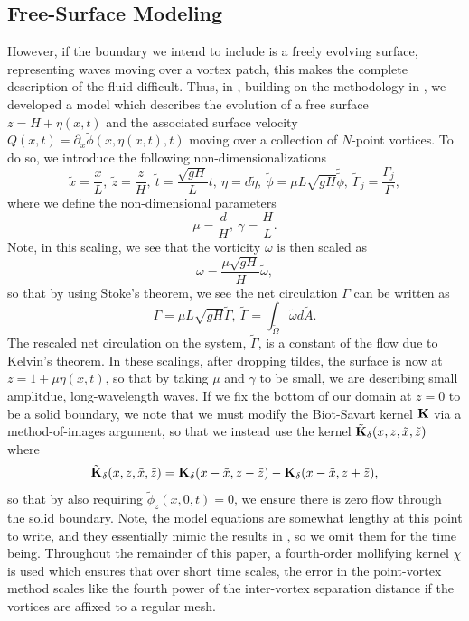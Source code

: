 \documentclass[a4paper,11pt]{article}
\newcommand{\p}{\partial}
\begin{document}
\subsection*{Free-Surface Modeling}
However, if the boundary we intend to include is a freely evolving surface, representing waves moving over a vortex patch, this makes the complete description of the fluid difficult.  Thus, in \cite{curtis}, building on the methodology in \cite{afm}, we developed a model which describes the evolution of a free surface $z=H + \eta(x,t)$ and the associated surface velocity $Q(x,t) = \p_{x} \tilde{\phi}(x,\eta(x,t),t)$ moving over a collection of $N$-point vortices.  To do so, we introduce the following non-dimensionalizations
\[
\tilde{x} = \frac{x}{L}, ~\tilde{z} = \frac{z}{H}, ~ \tilde{t} = \frac{\sqrt{gH}}{L} t, ~ \eta = d\tilde{\eta}, ~ \tilde{\phi} = \mu L\sqrt{gH} \tilde{\tilde{\phi}}, ~ \tilde{\Gamma}_{j} = \frac{\Gamma_{j}}{\Gamma},
\]
where we define the non-dimensional parameters
\[
\mu= \frac{d}{H}, ~ \gamma = \frac{H}{L}.  
\]
Note, in this scaling, we see that the vorticity $\omega$ is then scaled as 
\[
\omega = \frac{\mu \sqrt{gH}}{H}\tilde{\omega},
\]
so that by using Stoke's theorem, we see the net circulation $\Gamma$ can be written as 
\[
\Gamma = \mu L \sqrt{gH} \tilde{\Gamma}, ~ \tilde{\Gamma} = \int_{ \tilde{\Omega} } \tilde{\omega} d\tilde{A}.
\]
The rescaled net circulation on the system, $\tilde{\Gamma}$, is a constant of the flow due to Kelvin's theorem.  In these scalings, after dropping tildes, the surface is now at $z = 1 + \mu \eta(x,t)$,  so that by taking $\mu$ and $\gamma$ to be small, we are describing small amplitdue, long-wavelength waves.  If we fix the bottom of our domain at $z=0$ to be a solid boundary, we note that we must modify the Biot-Savart kernel ${\bf K}$ via a method-of-images argument, so that we instead use the kernel $\tilde{{\bf K}}_{\delta}(x,z,\tilde{x},\tilde{z})$ where 
\[
\tilde{{\bf K}}_{\delta}(x,z,\tilde{x},\tilde{z}) = {\bf K}_{\delta}(x-\tilde{x},z-\tilde{z}) - {\bf K}_{\delta}(x-\tilde{x},z+\tilde{z}),
\]
so that by also requiring $\tilde{\phi}_{z}(x,0,t)=0$, we ensure there is zero flow through the solid boundary.  Note, the model equations are somewhat lengthy at this point to write, and they essentially mimic the results in \cite{curtis}, so we omit them for the time being.  Throughout the remainder of this paper, a fourth-order mollifying kernel $\chi$ is used which ensures that over short time scales, the error in the point-vortex method scales like the fourth power of the inter-vortex separation distance if the vortices are affixed to a regular mesh.  
\end{document}

